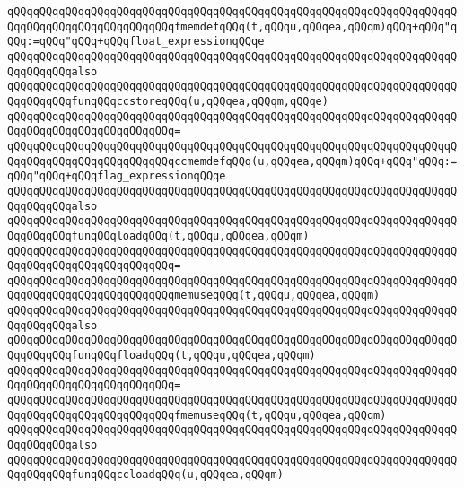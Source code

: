 \verb|qQQqqQQqqQQqqQQqqQQqqQQqqQQqqQQqqQQqqQQqqQQqqQQqqQQqqQQqqQQqqQQqqQQqqQQqqQQqqQQqqQQqqQQqqQQqqQQqfmemdefqQQq(t,qQQqu,qQQqea,qQQqm)qQQq+qQQq"qQQq:=qQQq"qQQq+qQQqfloat_expressionqQQqe|\newline
\newline
\verb|qQQqqQQqqQQqqQQqqQQqqQQqqQQqqQQqqQQqqQQqqQQqqQQqqQQqqQQqqQQqqQQqqQQqqQQqqQQqqQQqalso|\newline
\verb|qQQqqQQqqQQqqQQqqQQqqQQqqQQqqQQqqQQqqQQqqQQqqQQqqQQqqQQqqQQqqQQqqQQqqQQqqQQqqQQqfunqQQqccstoreqQQq(u,qQQqea,qQQqm,qQQqe)|\newline
\verb|qQQqqQQqqQQqqQQqqQQqqQQqqQQqqQQqqQQqqQQqqQQqqQQqqQQqqQQqqQQqqQQqqQQqqQQqqQQqqQQqqQQqqQQqqQQqqQQq=|\newline
\verb|qQQqqQQqqQQqqQQqqQQqqQQqqQQqqQQqqQQqqQQqqQQqqQQqqQQqqQQqqQQqqQQqqQQqqQQqqQQqqQQqqQQqqQQqqQQqqQQqccmemdefqQQq(u,qQQqea,qQQqm)qQQq+qQQq"qQQq:=qQQq"qQQq+qQQqflag_expressionqQQqe|\newline
\newline
\verb|qQQqqQQqqQQqqQQqqQQqqQQqqQQqqQQqqQQqqQQqqQQqqQQqqQQqqQQqqQQqqQQqqQQqqQQqqQQqqQQqalso|\newline
\verb|qQQqqQQqqQQqqQQqqQQqqQQqqQQqqQQqqQQqqQQqqQQqqQQqqQQqqQQqqQQqqQQqqQQqqQQqqQQqqQQqfunqQQqloadqQQq(t,qQQqu,qQQqea,qQQqm)|\newline
\verb|qQQqqQQqqQQqqQQqqQQqqQQqqQQqqQQqqQQqqQQqqQQqqQQqqQQqqQQqqQQqqQQqqQQqqQQqqQQqqQQqqQQqqQQqqQQqqQQq=|\newline
\verb|qQQqqQQqqQQqqQQqqQQqqQQqqQQqqQQqqQQqqQQqqQQqqQQqqQQqqQQqqQQqqQQqqQQqqQQqqQQqqQQqqQQqqQQqqQQqqQQqmemuseqQQq(t,qQQqu,qQQqea,qQQqm)|\newline
\newline
\verb|qQQqqQQqqQQqqQQqqQQqqQQqqQQqqQQqqQQqqQQqqQQqqQQqqQQqqQQqqQQqqQQqqQQqqQQqqQQqqQQqalso|\newline
\verb|qQQqqQQqqQQqqQQqqQQqqQQqqQQqqQQqqQQqqQQqqQQqqQQqqQQqqQQqqQQqqQQqqQQqqQQqqQQqqQQqfunqQQqfloadqQQq(t,qQQqu,qQQqea,qQQqm)|\newline
\verb|qQQqqQQqqQQqqQQqqQQqqQQqqQQqqQQqqQQqqQQqqQQqqQQqqQQqqQQqqQQqqQQqqQQqqQQqqQQqqQQqqQQqqQQqqQQqqQQq=|\newline
\verb|qQQqqQQqqQQqqQQqqQQqqQQqqQQqqQQqqQQqqQQqqQQqqQQqqQQqqQQqqQQqqQQqqQQqqQQqqQQqqQQqqQQqqQQqqQQqqQQqfmemuseqQQq(t,qQQqu,qQQqea,qQQqm)|\newline
\newline
\verb|qQQqqQQqqQQqqQQqqQQqqQQqqQQqqQQqqQQqqQQqqQQqqQQqqQQqqQQqqQQqqQQqqQQqqQQqqQQqqQQqalso|\newline
\verb|qQQqqQQqqQQqqQQqqQQqqQQqqQQqqQQqqQQqqQQqqQQqqQQqqQQqqQQqqQQqqQQqqQQqqQQqqQQqqQQqfunqQQqccloadqQQq(u,qQQqea,qQQqm)|\newline
